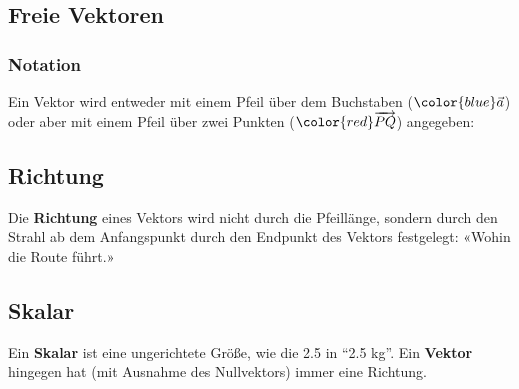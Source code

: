 
\newpage

\subsection{Freie Vektoren}

\subsubsection{Notation}

Ein Vektor wird entweder mit einem Pfeil über dem Buchstaben
(${\color{blue}\vec{a}}$) oder aber mit einem Pfeil über zwei
Punkten (${\color{red}\overrightarrow{{PQ}}}$) angegeben:



\subsection{Richtung}
Die \textbf{Richtung} eines Vektors wird nicht durch die Pfeillänge,
sondern durch den Strahl ab dem Anfangspunkt durch den Endpunkt des
Vektors festgelegt: «Wohin die Route führt.»


\subsection{Skalar}
Ein \textbf{Skalar} ist eine ungerichtete Größe, wie \zB die 2.5 in
``2.5 kg''.
Ein \textbf{Vektor} hingegen hat (mit Ausnahme des Nullvektors) immer
eine Richtung.

